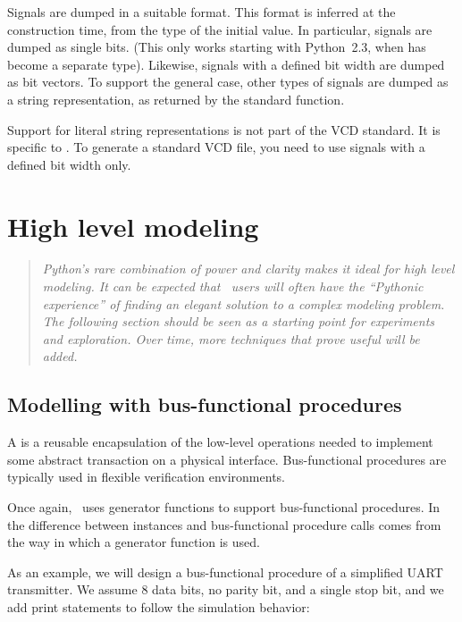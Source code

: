 Signals are dumped in a suitable format. This format is inferred at
the  construction time, from the type of the initial
value. In particular,  signals are dumped as single
bits. (This only works starting with Python~2.3, when  has
become a separate type).  Likewise,  signals with a
defined bit width are dumped as bit vectors. To support the general
case, other types of signals are dumped as a string representation, as
returned by the standard  function.

\begin{notice}[warning]
Support for literal string representations is not part of the VCD
standard. It is specific to . To generate a
standard VCD file, you need to use signals with a defined bit width
only.
\end{notice}


\section{High level modeling \label{model-hl}}

\begin{quote}
\em 
Python's rare combination of power and clarity makes it ideal for high
level modeling. It can be expected that \myhdl\ users will often have the
``Pythonic experience'' of finding an elegant solution to a complex
modeling problem.  The following section should be seen as a starting
point for experiments and exploration. Over time, more techniques that
prove useful will be added.
\end{quote}

\subsection{Modelling with bus-functional procedures \label{model-bfm}}

%
A  is a reusable encapsulation of the
low-level operations needed to implement some abstract transaction on
a physical interface. Bus-functional procedures are typically used in
flexible verification environments.

Once again, \myhdl\ uses generator functions to support
bus-functional procedures. In \myhdl\, the difference between
instances and bus-functional procedure calls comes from the way in
which a generator function is used.

As an example, we will design a bus-functional procedure of a
simplified UART transmitter. We assume 8 data bits, no parity bit, and
a single stop bit, and we add print statements to follow the
simulation behavior:

